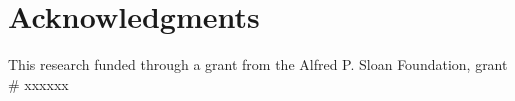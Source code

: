 \documentclass{acm_proc_article-sp}
\begin{document}
\section{Acknowledgments}
This research funded through a grant from the Alfred P. Sloan Foundation, grant \# xxxxxx

%

%
%

\end{document}
